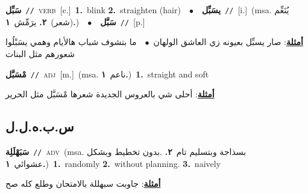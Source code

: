 \documentclass[10pt,a4paper,twoside]{article} %
\begin{document}
\begin{multicols}{2}
{{{{{{{{{{{{\setlength\topsep{0pt}\textbf{\foreignlanguage{arabic}{سَبِّل}}\ {\color{gray}\texttt{//}\color{black}}\ \textsc{verb}\ [c.]\ \textbf{1.}~blink  \textbf{2.}~straighten (hair)\ \ $\bullet$\ \ \setlength\topsep{0pt}\textbf{\foreignlanguage{arabic}{يسَبِّل}}\ {\color{gray}\texttt{//}\color{black}}\ [i.]\ \color{gray}(msa. \foreignlanguage{arabic}{يُنَعِّم (شعر)}~\foreignlanguage{arabic}{\textbf{٢.}}  \foreignlanguage{arabic}{يرَمِّش}~\foreignlanguage{arabic}{\textbf{١.}})\color{black}\ \ $\bullet$\ \ \setlength\topsep{0pt}\textbf{\foreignlanguage{arabic}{سَبَّل}}\ {\color{gray}\texttt{//}\color{black}}\ [p.]\  \begin{flushright}\color{gray}\foreignlanguage{arabic}{\textbf{\underline{\foreignlanguage{arabic}{أمثلة}}}: صار يسبِّل بعيونه زي العاشق الولهان\ $\bullet$\ \  ما بتشوف شباب هالأيام وهمي يسَبْلُوا شعورهم مثل البنات}\end{flushright}\color{black}} \vspace{2mm}

{\setlength\topsep{0pt}\textbf{\foreignlanguage{arabic}{مْسَبَّل}}\ {\color{gray}\texttt{//}\color{black}}\ \textsc{adj}\ [m.]\ \color{gray}(msa. \foreignlanguage{arabic}{ناعم}~\foreignlanguage{arabic}{\textbf{١.}})\color{black}\ \textbf{1.}~straight and soft\  \begin{flushright}\color{gray}\foreignlanguage{arabic}{\textbf{\underline{\foreignlanguage{arabic}{أمثلة}}}: أحلى شي بالعروس الجديدة شعرها مْسَبَّل مثل الحرير}\end{flushright}\color{black}} \vspace{2mm}

\vspace{-3mm}
\subsection*{\color{blue}\foreignlanguage{arabic}{س.ب.ه.ل.ل}\color{blue}{ (ntws)}} 

{\setlength\topsep{0pt}\textbf{\foreignlanguage{arabic}{سَبَهْلَلِة}}\ {\color{gray}\texttt{//}\color{black}}\ \textsc{adv}\ \color{gray}(msa. \foreignlanguage{arabic}{بسذاجة وبتسليم تام}~\foreignlanguage{arabic}{\textbf{٢.}}  .\foreignlanguage{arabic}{بدون تخطيط وبشكل عشوائي}~\foreignlanguage{arabic}{\textbf{١.}})\color{black}\ \textbf{1.}~randomly  \textbf{2.}~without planning.  \textbf{3.}~naively\  \begin{flushright}\color{gray}\foreignlanguage{arabic}{\textbf{\underline{\foreignlanguage{arabic}{أمثلة}}}: جاوبت سبهللة بالامتحان وطلع كله صح}\end{flushright}\color{black}} \vspace{2mm}

}}}}}}}}}}}
\end{multicols}
\end{document}
